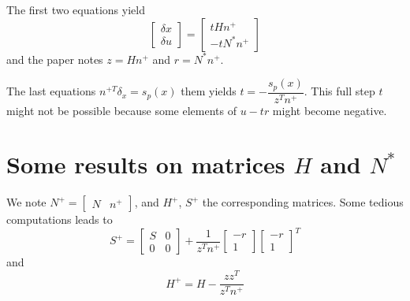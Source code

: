 \documentclass[11pt,a4paper]{article}
\newcommand{\BIN}{\begin{bmatrix}}
\newcommand{\BOUT}{\end{bmatrix}}
\begin{document}
The first two equations yield
\begin{equation}
	\BIN \delta x \\ \delta u \BOUT = \BIN t H n^+ \\ -t N^* n^+ \BOUT 
\end{equation}
and the paper notes $z = H n^+$ and $r = N^* n^+$.

The last equations $ n^{+T} \delta_x = s_p(x)$ them yields $t = -\dfrac{s_p(x)}{z^Tn^+}$. This full step $t$ might not be possible because some elements of $u - tr$ might become negative.

\section{Some results on matrices $H$ and $N^*$}
We note $N^+ = \BIN N & n^+\BOUT$, and $H^+$, $S^+$ the corresponding matrices.
Some tedious computations leads to
\begin{equation}
	S^+ = \BIN S & 0 \\ 0 & 0 \BOUT + \frac{1}{z^T n^+} \BIN -r \\ 1\BOUT \BIN -r \\ 1\BOUT^T
\end{equation}
and 
\begin{equation}
	H^+ = H - \frac{z z^T}{z^T n^+}
\end{equation}



\end{document}
